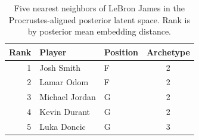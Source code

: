 \begin{table}[htbp]
  \centering\small
  \begin{tabular}{rllc}
    \toprule
    Rank & Player & Position & Archetype \\
    \midrule
    1 & Josh Smith & F & 2 \\
    2 & Lamar Odom & F & 2 \\
    3 & Michael Jordan & G & 2 \\
    4 & Kevin Durant & G & 2 \\
    5 & Luka Doncic & G & 3 \\
    \bottomrule
  \end{tabular}
  \caption{Five nearest neighbors of LeBron James in the Procrustes-aligned posterior latent space. Rank is by posterior mean embedding distance.}
  \label{tab:LeBron_James_neighbors}
\end{table}

